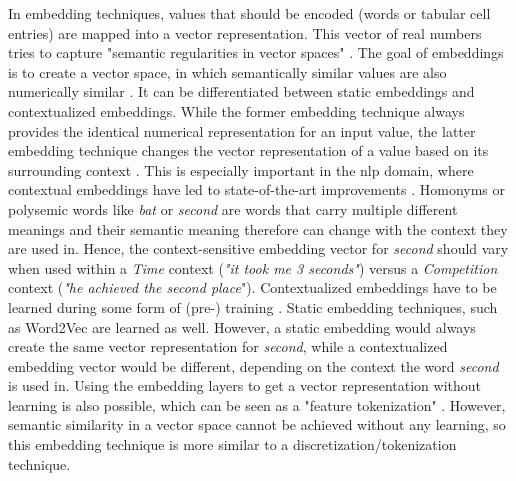 In embedding techniques, values that should be encoded (\eg words or tabular cell entries) are mapped into a vector representation. 
This vector of real numbers tries to capture "semantic regularities in vector spaces" \cite[p. 2]{pilaluisa2022ContextualWordEmbeddings}.
The goal of embeddings is to create a vector space, in which semantically similar values are also numerically similar \cite{pilaluisa2022ContextualWordEmbeddings}.
It can be differentiated between static embeddings and contextualized embeddings. 
While the former embedding technique always provides the identical numerical representation for an input value, the latter embedding technique changes the vector representation of a value based on its surrounding context \cite{pilaluisa2022ContextualWordEmbeddings}.
This is especially important in the \gls{nlp} domain, where contextual embeddings have led to state-of-the-art improvements \cite{pilaluisa2022ContextualWordEmbeddings}.
Homonyms or polysemic words like \textit{bat} or \textit{second} are words that carry multiple different meanings and their semantic meaning therefore can change with the context they are used in.
Hence, the context-sensitive embedding vector for \textit{second} should vary when used within a \textit{Time} context (\eg \textit{"it took me 3 seconds"}) versus a \textit{Competition} context (\eg \textit{"he achieved the second place}").
Contextualized embeddings have to be learned during some form of (pre-) training \cite{devlin2019BERTPretrainingDeep, iida2021TABBIEPretrainedRepresentations, deng2021TURLTableUnderstanding}. 
Static embedding techniques, such as Word2Vec \cite{mikolov2013DistributedRepresentationsWords} are learned as well.
However, a static embedding would always create the same vector representation for \textit{second}, while a contextualized embedding vector would be different, depending on the context the word \textit{second} is used in.
Using the embedding layers to get a vector representation without learning is also possible, which can be seen as a "feature tokenization" \cite{zheng2022DiffusionModelsMissing, gorishniy2021RevisitingDeepLearning}.
However, semantic similarity in a vector space cannot be achieved without any learning, so this embedding technique is more similar to a discretization/tokenization technique.


